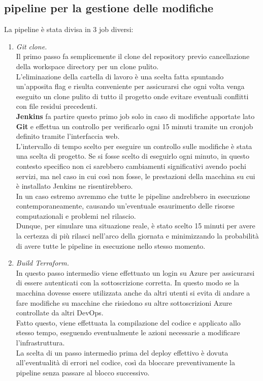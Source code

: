 \documentclass[a4paper,12pt]{report}
\begin{document}
\subsection{pipeline per la gestione delle modifiche}
La pipeline è stata divisa in 3 job diversi:\\
\begin{enumerate}
\item \textit{Git clone.} \\
Il primo passo fa semplicemente il clone del repository previo cancellazione della workspace directory per un clone pulito.\\
L'eliminazione della cartella di lavoro è una scelta fatta spuntando un'apposita flag e risulta conveniente per assicurarsi che ogni volta venga eseguito un clone pulito di tutto il progetto onde evitare eventuali conflitti con file residui precedenti.\\
\textbf{Jenkins} fa partire questo primo job solo in caso di modifiche apportate lato \textbf{Git} e effettua un controllo per verificarlo ogni 15 minuti tramite un cronjob definito tramite l'interfaccia web. \\
L'intervallo di tempo scelto per eseguire un controllo sulle modifiche è stata una scelta di progetto. Se si fosse scelto di eseguirlo ogni minuto, in questo contesto specifico non ci sarebbero cambiamenti significativi avendo pochi servizi, ma nel caso in cui così non fosse, le prestazioni della macchina su cui è installato Jenkins ne risentirebbero. \\In un caso estremo avremmo che tutte le pipeline andrebbero in esecuzione contemporaneamente, causando un'eventuale esaurimento delle risorse computazionali e problemi nel rilascio. \\
Dunque, per simulare una situazione reale, è stato scelto 15 minuti per avere la certezza di più rilasci nell'arco della giornata e minimizzando la probabilità di avere tutte le pipeline in esecuzione nello stesso momento.

\item \textit{Build Terraform.} \\
In questo passo intermedio viene effettuato un login su Azure per assicurarsi di essere autenticati con la sottoscrizione corretta. In questo modo se la macchina dovesse essere utilizzata anche da altri utenti si evita di andare a fare modifiche su macchine che risiedono su altre sottoscrizioni Azure controllate da altri DevOps.\\
Fatto questo, viene effettuata la compilazione del codice e applicato allo stesso tempo, eseguendo eventualmente le azioni necessarie a modificare l'infrastruttura.\\
La scelta di un passo intermedio prima del deploy effettivo è dovuta all'eventualità di errori nel codice, così da bloccare preventivamente la pipeline senza passare al blocco successivo.\\


\end{enumerate}
\end{document}
